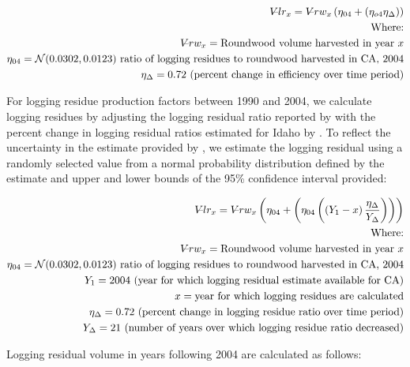 \documentclass[a4paper,titlepage]{article}
\begin{document}
\begin{align*}
V\llap{--}lr_{x} = V\llap{--}rw_{x}\left(\eta_{04}+\left(\eta_{o4}\eta_\Delta\right)\right)\\
\text{Where:}\\
V\llap{--}rw_{x} = \text{Roundwood volume harvested in year }x\\
\eta_{04} = \mathcal{N}(0.0302,0.0123) \text{ ratio of logging residues to roundwood harvested in CA, 2004}\\
\eta_\Delta = 0.72 \text{ (percent change in efficiency over time period)}\\
\end{align*}

For logging residue production factors between 1990 and 2004, we calculate logging residues by adjusting the logging residual ratio reported by \citet{Morgan} with the percent change in logging residual ratios estimated for Idaho by \citet{Simmons2014}. To reflect the uncertainty in the estimate provided by \citet{Morgan}, we estimate the logging residual using a randomly selected value from a normal probability distribution defined by the estimate and upper and lower bounds of the 95\% confidence interval provided:


\begin{align*}
V\llap{--}lr_{x} = V\llap{--}rw_{x}\left(\eta_{04}+ \left(\eta_{04}\left(\left(Y_1-x\right)\frac{\eta_\Delta}{Y_\Delta}\right)\right)\right)\\
\text{Where:}\\
V\llap{--}rw_{x} = \text{Roundwood volume harvested in year }x\\
\eta_{04} = \mathcal{N}(0.0302,0.0123) \text{ ratio of logging residues to roundwood harvested in CA, 2004}\\
Y_1 = 2004 \text{ (year for which logging residual estimate available for CA)} \\
x = \text{year for which logging residues are calculated}\\
\eta_\Delta = 0.72 \text{ (percent change in logging residue ratio over time period)}\\
Y_\Delta = 21\text{ (number of years over which logging residue ratio decreased)}
\end{align*}

Logging residual volume in years following 2004 are calculated as follows:
\end{document}
